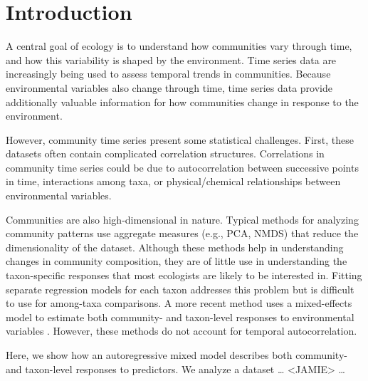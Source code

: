 

\section*{Introduction}


A central goal of ecology is to understand how communities vary through time, and
how this variability is shaped by the environment.
Time series data are increasingly being used to assess temporal trends in communities.
Because environmental variables also change through time, time series data provide
additionally valuable information for how communities change in response to the
environment.


However, community time series present some statistical challenges.
First, these datasets often contain complicated correlation structures.
Correlations in community time series could be due to
autocorrelation between successive points in time,
interactions among taxa,
or physical/chemical relationships between environmental variables.


Communities are also high-dimensional in nature.
Typical methods for analyzing community patterns use aggregate measures (e.g., PCA, NMDS)
that reduce the dimensionality of the dataset.
Although these methods help in understanding changes in community composition,
they are of little use in understanding the taxon-specific responses
that most ecologists are likely to be interested in.
Fitting separate regression models for each taxon addresses this problem but
is difficult to use for among-taxa comparisons.
A more recent method uses a mixed-effects model to estimate both
community- and taxon-level responses to environmental variables \citep{Jackson2012}.
However, these methods do not account for temporal autocorrelation.


Here, we show how an autoregressive mixed model describes both community- and
taxon-level responses to predictors.
We analyze a dataset
\ldots
<JAMIE>
\ldots







